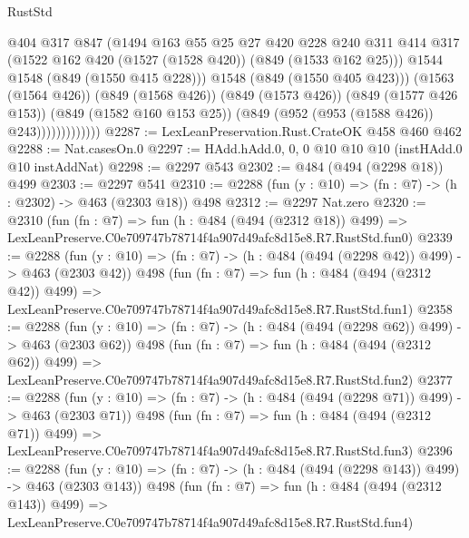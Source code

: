 \begin{lexlean}{RustStd}
\begin{coremodule}
                            @404
                            @317
                            @847
                            (@1494
                              @163
                              @55
                              @25
                              @27
                              @420
                              @228
                              @240
                              @311
                              @414
                              @317
                              (@1522 @162 @420 (@1527 (@1528 @420)) (@849 (@1533 @162 @25)))
                              @1544
                              @1548
                              (@849 (@1550 @415 @228)))
                            @1548
                            (@849 (@1550 @405 @423)))
                          (@1563 (@1564 @426))
                          (@849 (@1568 @426))
                          (@849 (@1573 @426))
                          (@849 (@1577 @426 @153))
                          (@849 (@1582 @160 @153 @25))
                          (@849 (@952 (@953 (@1588 @426)) @243)))))))))))))
@2287 := LexLeanPreservation.Rust.CrateOK @458 @460 @462
@2288 := Nat.casesOn.{0}
@2297 := HAdd.hAdd.{0, 0, 0} @10 @10 @10 (instHAdd.{0} @10 instAddNat)
@2298 := @2297 @543
@2302 := @484 (@494 (@2298 @18)) @499
@2303 := @2297 @541
@2310 := @2288 (fun (y : @10) => (fn : @7) -> (h : @2302) -> @463 (@2303 @18)) @498
@2312 := @2297 Nat.zero
@2320 := @2310
    (fun (fn : @7) =>
    fun (h : @484 (@494 (@2312 @18)) @499) =>
    LexLeanPreserve.C0e709747b78714f4a907d49afc8d15e8.R7.RustStd.fun0)
@2339 := @2288
    (fun (y : @10) => (fn : @7) -> (h : @484 (@494 (@2298 @42)) @499) -> @463 (@2303 @42))
    @498
    (fun (fn : @7) =>
    fun (h : @484 (@494 (@2312 @42)) @499) =>
    LexLeanPreserve.C0e709747b78714f4a907d49afc8d15e8.R7.RustStd.fun1)
@2358 := @2288
    (fun (y : @10) => (fn : @7) -> (h : @484 (@494 (@2298 @62)) @499) -> @463 (@2303 @62))
    @498
    (fun (fn : @7) =>
    fun (h : @484 (@494 (@2312 @62)) @499) =>
    LexLeanPreserve.C0e709747b78714f4a907d49afc8d15e8.R7.RustStd.fun2)
@2377 := @2288
    (fun (y : @10) => (fn : @7) -> (h : @484 (@494 (@2298 @71)) @499) -> @463 (@2303 @71))
    @498
    (fun (fn : @7) =>
    fun (h : @484 (@494 (@2312 @71)) @499) =>
    LexLeanPreserve.C0e709747b78714f4a907d49afc8d15e8.R7.RustStd.fun3)
@2396 := @2288
    (fun (y : @10) => (fn : @7) -> (h : @484 (@494 (@2298 @143)) @499) -> @463 (@2303 @143))
    @498
    (fun (fn : @7) =>
    fun (h : @484 (@494 (@2312 @143)) @499) =>
    LexLeanPreserve.C0e709747b78714f4a907d49afc8d15e8.R7.RustStd.fun4)

\end{coremodule}
\end{lexlean}
